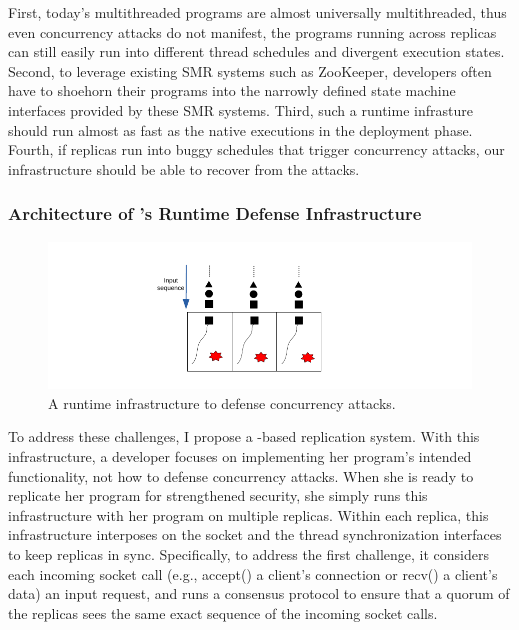 First, today’s multithreaded programs are almost universally
multithreaded, thus even concurrency attacks do not manifest, the programs 
running across replicas can still easily run into different thread schedules 
and divergent execution states. Second, to leverage existing SMR systems such 
as ZooKeeper, developers often have to shoehorn their programs into the 
narrowly defined state machine interfaces provided by these SMR systems. Third, 
such a runtime infrasture should run almost as fast as the native executions in 
the deployment phase. Fourth, if replicas run into buggy schedules that trigger 
concurrency attacks, our infrastructure should be able to recover from the 
attacks.

\subsubsection{Architecture of \xxx's Runtime Defense Infrastructure} 
\label{sec:defense-arch}

\begin{figure}[t]
\centering
\includegraphics[width=0.3\columnwidth]{figures/defense}
\vspace{-.05in}
\caption{{A runtime infrastructure to defense concurrency attacks.}} 
\label{fig:defense}
\vspace{-.05in}
\end{figure}

To address these challenges, I propose a \smr-based replication 
system. With this infrastructure, a developer focuses on implementing her 
program’s intended functionality, not how to defense concurrency attacks. When 
she is ready to replicate her program for strengthened security, she simply
runs this infrastructure with her program on multiple replicas. Within
each replica, this infrastructure interposes on the socket and the thread
synchronization interfaces to keep replicas in sync. Specifically, to address 
the first challenge, it considers each incoming socket call (e.g., accept() a 
client’s connection or recv() a client’s data) an input request, and runs a 
\paxos consensus protocol to ensure that a quorum of the replicas sees the same 
exact sequence of the incoming socket calls.

